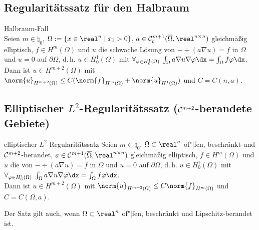 \subsection{%
    Regularitätssatz für den Halbraum%
}

\begin{Satz}{Halbraum-Fall}\\
    Seien $m \in \natural_0$,
    $\Omega := \{x \in \real^n \;|\; x_1 > 0\}$,
    $a \in \C^{m+1}_b(\overline{\Omega}, \real^{n \times n})$ gleichmäßig elliptisch,
    $f \in H^m(\Omega)$ und $u$ die schwache Lösung von
    $-\div(a \nabla u) = f$ in $\Omega$ und $u = 0$ auf $\partial\Omega$, d.\,h.
    $u \in H^1_0(\Omega)$ mit $\forall_{\varphi \in H^1_0(\Omega)}\;
    \int_\Omega a \nabla u \nabla\varphi \dx = \int_\Omega f\varphi \dx$.\\
    Dann ist $u \in H^{m+2}(\Omega)$ mit
    $\norm{u}_{H^{m+2}(\Omega)} \le
    C (\norm{f}_{H^m(\Omega)} + \norm{u}_{H^1(\Omega)})$ und $C = C(n, a)$.
\end{Satz}

\pagebreak

\subsection{%
    Elliptischer \texorpdfstring{$L^2$}{L²}-Regularitätssatz
    (\texorpdfstring{$\mathcal{C}^{m+2}$}{Cᵐ⁺²}-berandete Gebiete)%
}

\begin{Satz}{elliptischer $L^2$-Regularitätssatz}
    Seien $m \in \natural_0$,
    $\Omega \subset \real^n$ of"|fen, beschränkt und $\mathcal{C}^{m+2}$-berandet,
    $a \in \C^{m+1}(\overline{\Omega}, \real^{n \times n})$ gleichmäßig elliptisch,
    $f \in H^m(\Omega)$ und $u$ die  von
    $-\div(a \nabla u) = f$ in $\Omega$ und $u = 0$ auf $\partial\Omega$, d.\,h.
    $u \in H^1_0(\Omega)$ mit $\forall_{\varphi \in H^1_0(\Omega)}\;
    \int_\Omega a \nabla u \nabla\varphi \dx = \int_\Omega f\varphi \dx$.\\
    Dann ist $u \in H^{m+2}(\Omega)$ mit
    $\norm{u}_{H^{m+2}(\Omega)} \le C \norm{f}_{H^m(\Omega)}$ und $C = C(\Omega, a)$.
\end{Satz}

\begin{Bem}
    Der Satz gilt auch, wenn $\Omega \subset \real^n$ of"|fen, beschränkt und Lipschitz-berandet
    ist.
\end{Bem}

\linie

